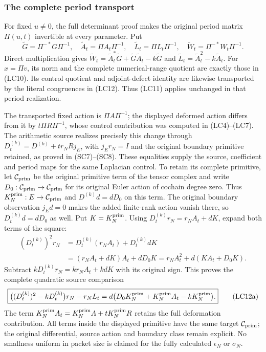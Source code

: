 \subsubsection{The complete period transport}

For fixed \(u\ne0\), the full determinant proof makes the original
period matrix \(\Pi(u,t)\) invertible at every parameter. Put
\[
 \widetilde G=\Pi^{-*}G\Pi^{-1},\quad
 \widetilde A_t=\Pi A_t\Pi^{-1},\quad
 \widetilde L_t=\Pi L_t\Pi^{-1},\quad
 \widetilde W_t=\Pi^{-*}W_t\Pi^{-1}.
 \tag{LC12}
\]
Direct multiplication gives
\(\widetilde W_t=\widetilde A_t^*\widetilde G+
\widetilde G\widetilde A_t-k\widetilde G\) and
\(\widetilde L_t=\widetilde A_t^2-k\widetilde A_t\).
For \(x=\Pi v\), its norm and the complete numerical-range quotient
are exactly those in (LC10). Its control quotient and adjoint-defect
identity are likewise transported by the literal congruences in
(LC12). Thus (LC11) applies unchanged in that period realization.

The transported fixed action is \(\Pi A\Pi^{-1}\); the displayed
deformed action differs from it by \(t\Pi R\Pi^{-1}\), whose
control contribution was computed in (LC4)--(LC7). The arithmetic
source realizes precisely this change through
\(D_t^{(k)}=D^{(k)}+t r_NRj_E\), with
\(j_Er_N=I\) and the original boundary primitive retained, as
proved in (SC7)--(SC8). These equalities supply the source,
coefficient and period maps for the same Laplacian control.
To retain its complete primitive, let $\mathcal C_{\rm prim}$
be the original primitive term of the tensor complex and write
$D_0:\mathcal C_{\rm prim}\to\mathcal C_{\rm prim}$ for its
original Euler action of cochain degree zero. Thus
$K_N^{\rm prim}:E\to\mathcal C_{\rm prim}$ and
$D^{(k)}d=dD_0$ on this term. The original boundary observation
$j_Ed=0$ makes the added finite-rank action vanish there, so
$D_t^{(k)}d=dD_0$ as well. Put $K=K_N^{\rm prim}$.
Using $D_t^{(k)}r_N=r_NA_t+dK$, expand both terms of the square:
\[
\begin{split}
 (D_t^{(k)})^2r_N
 &=D_t^{(k)}(r_NA_t)+D_t^{(k)}dK\\
 &=(r_NA_t+dK)A_t+dD_0K
   =r_NA_t^2+d(KA_t+D_0K).
\end{split}
\]
Subtract $kD_t^{(k)}r_N=kr_NA_t+kdK$ with its original sign.
This proves the complete quadratic source comparison
\[
 \boxed{\bigl((D_t^{(k)})^2-kD_t^{(k)}\bigr)r_N-r_NL_t
       =d\bigl(D_0K_N^{\rm prim}+K_N^{\rm prim}A_t
                                      -kK_N^{\rm prim}\bigr).}
 \tag{LC12a}
\]
The term $K_N^{\rm prim}A_t=K_N^{\rm prim}A+
tK_N^{\rm prim}R$ retains the full deformation contribution.
All terms inside the displayed primitive have the same target
$\mathcal C_{\rm prim}$; the original differential, source action
and boundary class remain explicit.
No smallness uniform in packet size is claimed for the fully
calculated \(\epsilon_N\) or \(\sigma_N\).

